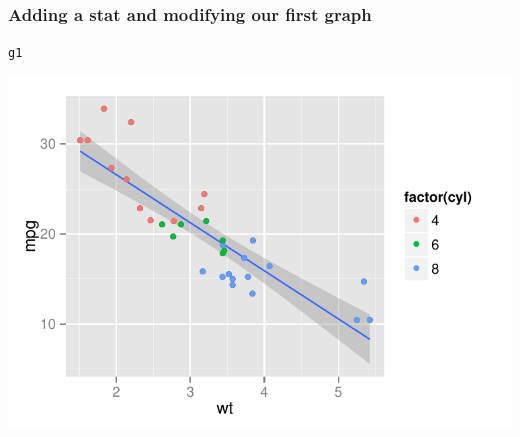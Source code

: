 \documentclass{beamer}\usepackage{graphicx, color}
\makeatletter
\def\maxwidth{ %
  \ifdim\Gin@nat@width>\linewidth
    \linewidth
  \else
    \Gin@nat@width
  \fi
}
\newenvironment{kframe}{%
 \def\at@end@of@kframe{}%
 \ifinner\ifhmode%
  \def\at@end@of@kframe{\end{minipage}}%
  \begin{minipage}{\columnwidth}%
 \fi\fi%
 \def\FrameCommand##1{\hskip\@totalleftmargin \hskip-\fboxsep
 \colorbox{shadecolor}{##1}\hskip-\fboxsep
     \hskip-\linewidth \hskip-\@totalleftmargin \hskip\columnwidth}%
 \MakeFramed {\advance\hsize-\width
   \@totalleftmargin\z@ \linewidth\hsize
   \@setminipage}}%
 {\par\unskip\endMakeFramed%
 \at@end@of@kframe}
\newenvironment{knitrout}{}{} %
\makeatother
\begin{document}
\begin{frame}[fragile]
  \frametitle{Adding a stat and modifying our first graph}
\begin{knitrout}
\color{fgcolor}\begin{kframe}
\begin{alltt}
g1
\end{alltt}
\end{kframe}
\includegraphics[width=\maxwidth]{figure/first-mod-print} 

\end{knitrout}

\end{frame}
\end{document}
